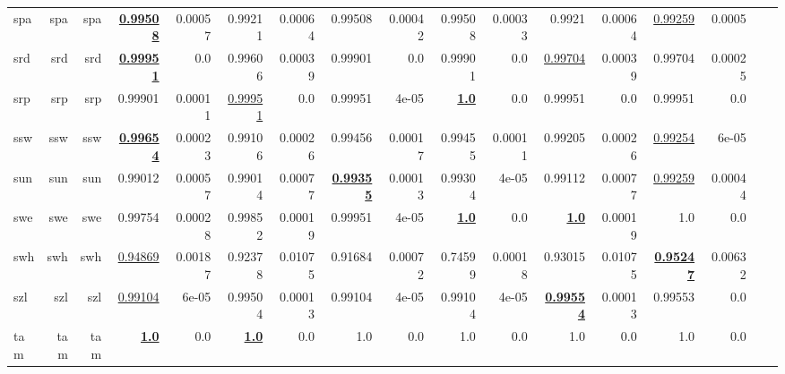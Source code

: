 \documentclass[11pt]{article}
\begin{document}
\begin{table*}[h]
{\begin{tabular}{lrrrrrrrrrrrrrrrr}
spa         & spa         & spa         & \textbf{\underline{0.99508}}         & 0.00057         & 0.99211         & 0.00064         & 0.99508         & 0.00042         & 0.99508         & 0.00033         & 0.9921         & 0.00064         & \underline{0.99259}         & 0.0005         \\
srd         & srd         & srd         & \textbf{\underline{0.99951}}         & 0.0         & 0.99606         & 0.00039         & 0.99901         & 0.0         & 0.99901         & 0.0         & \underline{0.99704}         & 0.00039         & 0.99704         & 0.00025         \\
srp         & srp         & srp         & 0.99901         & 0.00011         & \underline{0.99951}         & 0.0         & 0.99951         & 4e-05         & \textbf{\underline{1.0}}         & 0.0         & 0.99951         & 0.0         & 0.99951         & 0.0         \\
ssw         & ssw         & ssw         & \textbf{\underline{0.99654}}         & 0.00023         & 0.99106         & 0.00026         & 0.99456         & 0.00017         & 0.99455         & 0.00011         & 0.99205         & 0.00026         & \underline{0.99254}         & 6e-05         \\
sun         & sun         & sun         & 0.99012         & 0.00057         & 0.99014         & 0.00077         & \textbf{\underline{0.99355}}         & 0.00013         & 0.99304         & 4e-05         & 0.99112         & 0.00077         & \underline{0.99259}         & 0.00044         \\
swe         & swe         & swe         & 0.99754         & 0.00028         & 0.99852         & 0.00019         & 0.99951         & 4e-05         & \textbf{\underline{1.0}}         & 0.0         & \textbf{\underline{1.0}}         & 0.00019         & 1.0         & 0.0         \\
swh         & swh         & swh         & \underline{0.94869}         & 0.00187         & 0.92378         & 0.01075         & 0.91684         & 0.00072         & 0.74599         & 0.00018         & 0.93015         & 0.01075         & \textbf{\underline{0.95247}}         & 0.00632         \\
szl         & szl         & szl         & \underline{0.99104}         & 6e-05         & 0.99504         & 0.00013         & 0.99104         & 4e-05         & 0.99104         & 4e-05         & \textbf{\underline{0.99554}}         & 0.00013         & 0.99553         & 0.0         \\
tam         & tam         & tam         & \textbf{\underline{1.0}}         & 0.0         & \textbf{\underline{1.0}}         & 0.0         & 1.0         & 0.0         & 1.0         & 0.0         & 1.0         & 0.0         & 1.0         & 0.0         \\

\end{tabular}}
\end{table*}
\end{document}
